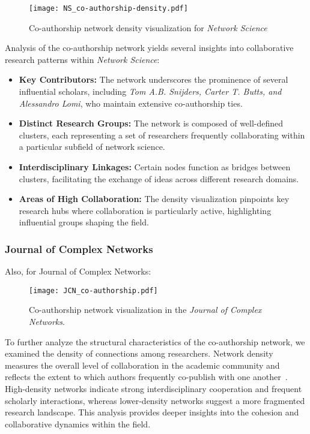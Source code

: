 \documentclass[twocolumn]{article}
\begin{document}
		\begin{figure}[htbp]
			\centering
			\texttt{[image: NS\_co-authorship-density.pdf]}
			\caption{Co-authorship network density visualization for \textit{Network Science}}
			\label{fig.fig16}
		\end{figure}
		
		Analysis of the co-authorship network yields several insights into collaborative research patterns within \textit{Network Science}:
		
		\begin{itemize}
			\item \textbf{Key Contributors:} The network underscores the prominence of several influential scholars, including \textit{Tom A.B. Snijders, Carter T. Butts, and Alessandro Lomi}, who maintain extensive co-authorship ties.
			\item \textbf{Distinct Research Groups:} The network is composed of well-defined clusters, each representing a set of researchers frequently collaborating within a particular subfield of network science.
			\item \textbf{Interdisciplinary Linkages:} Certain nodes function as bridges between clusters, facilitating the exchange of ideas across different research domains.
			\item \textbf{Areas of High Collaboration:} The density visualization pinpoints key research hubs where collaboration is particularly active, highlighting influential groups shaping the field.
		\end{itemize}
		
		\subsubsection*{Journal of Complex Networks}
		Also, for Journal of Complex Networks: 
		
		\begin{figure}[htbp]
			\centering
			\texttt{[image: JCN\_co-authorship.pdf]}
			\caption{Co-authorship network visualization in the \textit{Journal of Complex Networks}.}
			\label{fig.fig12}
		\end{figure}
		
		To further analyze the structural characteristics of the co-authorship network, we examined the density of connections among researchers. Network density measures the overall level of collaboration in the academic community and reflects the extent to which authors frequently co-publish with one another~\cite{newman2001scientific, moody2004sociology, Barabasi2016}. High-density networks indicate strong interdisciplinary cooperation and frequent scholarly interactions, whereas lower-density networks suggest a more fragmented research landscape. This analysis provides deeper insights into the cohesion and collaborative dynamics within the field.
		
\end{document}

